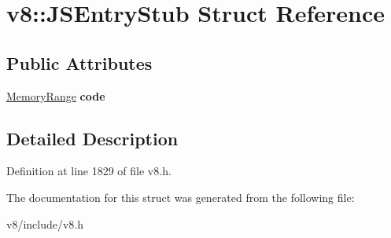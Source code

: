 \hypertarget{structv8_1_1JSEntryStub}{}\section{v8\+:\+:J\+S\+Entry\+Stub Struct Reference}
\label{structv8_1_1JSEntryStub}
\subsection*{Public Attributes}
\begin{DoxyCompactItemize}
\item 
\mbox{\label{structv8_1_1JSEntryStub_a86cf44d2ee29d523a33a0f2f2fe407d0}} 
\mbox{\hyperlink{structv8_1_1MemoryRange}{Memory\+Range}} {\bfseries code}
\end{DoxyCompactItemize}


\subsection{Detailed Description}


Definition at line 1829 of file v8.\+h.



The documentation for this struct was generated from the following file\+:\begin{DoxyCompactItemize}
\item 
v8/include/v8.\+h\end{DoxyCompactItemize}

